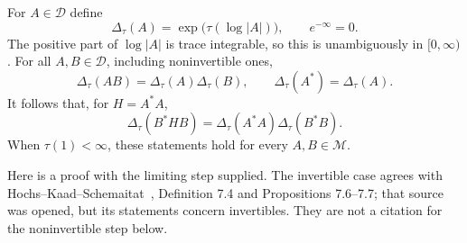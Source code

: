 \begin{theorem}
\label{geo-H-determinant}
For $A\in\mathcal D$ define
\[
 \Delta_\tau(A)=\exp\bigl(\tau(\log|A|)\bigr),\qquad e^{-\infty}=0.
\]
The positive part of $\log|A|$ is trace integrable, so this is unambiguously
in $[0,\infty)$. For all $A,B\in\mathcal D$, including noninvertible ones,
\[
 \Delta_\tau(AB)=\Delta_\tau(A)\Delta_\tau(B),\qquad
 \Delta_\tau(A^*)=\Delta_\tau(A).
\]
It follows that, for $H=A^*A$,
\[
 \Delta_\tau(B^*HB)
 =\Delta_\tau(A^*A)\Delta_\tau(B^*B).
\]
When $\tau(1)<\infty$, these statements hold for every $A,B\in\mathcal M$.
\end{theorem}

Here is a proof with the limiting step supplied. The invertible case agrees
with Hochs--Kaad--Schemaitat~\cite{HKS2018}, Definition 7.4 and Propositions
7.6--7.7; that source was opened, but its statements concern invertibles.
They are not a citation for the noninvertible step below.


